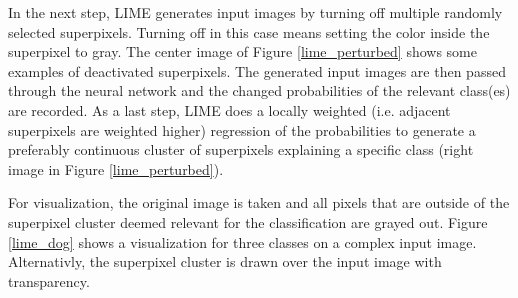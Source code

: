 In the next step, LIME generates input images by turning off multiple randomly selected superpixels. Turning off in this case means setting the color inside the superpixel to gray. The center image of Figure \ref{lime_perturbed} shows some examples of deactivated superpixels. The generated input images are then passed through the neural network and the changed probabilities of the relevant class(es) are recorded. As a last step, LIME does a locally weighted (i.e. adjacent superpixels are weighted higher) regression of the probabilities to generate a preferably continuous cluster of superpixels explaining a specific class (right image in Figure \ref{lime_perturbed}).

For visualization, the original image is taken and all pixels that are outside of the superpixel cluster deemed relevant for the classification are grayed out.
Figure \ref{lime_dog} shows a visualization for three classes on a complex input image. Alternativly, the superpixel cluster is drawn over the input image with transparency.

